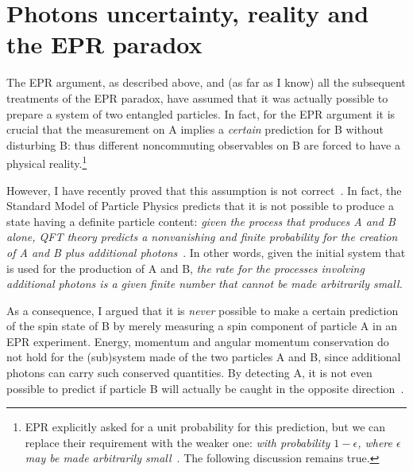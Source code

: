 \documentclass[published]{JHEP3}
\begin{document}
\section{Photons uncertainty, reality and the EPR paradox} 

The EPR argument, as described above, and (as far as I know) all the
subsequent treatments of the EPR paradox, have assumed that it was
actually possible to prepare a system of two entangled particles.  In
fact, for the EPR argument it is crucial that the measurement on A
implies a \emph{certain} prediction for B without disturbing B: thus
different noncommuting observables on B are forced to have a physical
reality.\footnote{EPR explicitly asked for a unit probability for this
prediction, but we can replace their requirement with the weaker one:
\emph{with probability $1-\epsilon$, where $\epsilon$ may be made
arbitrarily small}~\cite{Ballentine70}. The following discussion
remains true.}

However, I have recently proved that this assumption is not
correct~\cite{pureprp}. In fact, the Standard Model of Particle
Physics predicts that it is not possible to produce a state having a
definite particle content: \emph{given the process that produces A and
B alone, QFT theory predicts a nonvanishing and finite probability for
the creation of A and B plus additional photons}~\cite{pureprp}. In
other words, given the initial system that is used for the production
of A and B, \emph{the rate for the processes involving additional
photons is a given finite number that cannot be made arbitrarily
small.}

As a consequence, I argued that it is \emph{never} possible to make
a certain prediction of the spin state of B by merely measuring a
spin component of particle A in an EPR experiment. Energy,
momentum and angular momentum conservation do not hold for the
(sub)system made of the two particles A and B, since additional
photons can carry such conserved quantities. By detecting A, it is
not even possible to predict if particle B will actually be caught
in the opposite direction~\cite{pureprp}.
\end{document}
